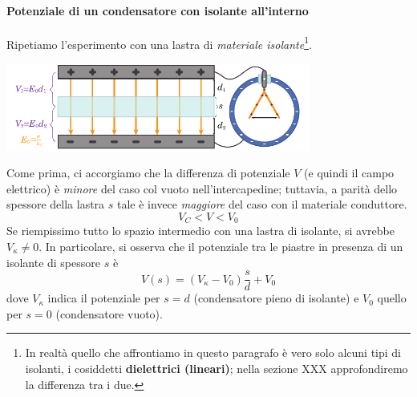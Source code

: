 \paragraph{Potenziale di un condensatore con isolante all'interno}
Ripetiamo l'esperimento con una lastra di \textit{materiale isolante}\footnote{In realtà quello che affrontiamo in questo paragrafo è vero solo alcuni tipi di isolanti, i cosiddetti \textbf{dielettrici (lineari)}; nella sezione XXX approfondiremo la differenza tra i due.}.
\begin{center}
	\includegraphics[width=0.75\textwidth]{images/chp6/chp6elettroscopio3.pdf}
\end{center}
Come prima, ci accorgiamo che la differenza di potenziale $V$ (e quindi il campo elettrico) è \textit{minore} del caso col vuoto nell'intercapedine; tuttavia, a parità dello spessore della lastra $s$ tale \ddp è invece \textit{maggiore} del caso con il materiale conduttore.
\begin{equation*}
	V_{C}<V<V_0
\end{equation*}
Se riempissimo tutto lo spazio intermedio con una lastra di isolante, si avrebbe $V_{\kappa}\neq0$. In particolare, si osserva che il potenziale tra le piastre in presenza di un isolante di spessore $s$ è
\begin{equation*}
	V(s)=\left(V_{\kappa}-V_0\right)\frac{s}{d}+V_0
\end{equation*} 
dove $V_{\kappa}$ indica il potenziale per $s=d$ (condensatore pieno di isolante) e $V_0$ quello per $s=0$  (condensatore vuoto).

